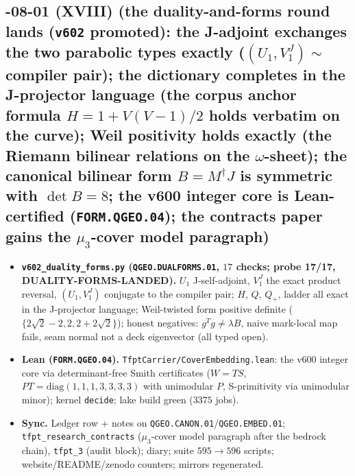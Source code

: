 \subsection*{-08-01 (XVIII) (the duality-and-forms round lands (\texttt{v602} promoted): the J-adjoint exchanges the two parabolic types exactly ($(U_1,V_1^J)\sim$ compiler pair); the dictionary completes in the J-projector language (the corpus anchor formula $H=1+V(V-1)/2$ holds verbatim on the curve); Weil positivity holds exactly (the Riemann bilinear relations on the $\omega$-sheet); the canonical bilinear form $B=M^\dagger J$ is symmetric with $\det B=8$; the v600 integer core is Lean-certified (\texttt{FORM.QGEO.04}); the contracts paper gains the $\mu_3$-cover model paragraph)}
\begin{itemize}[leftmargin=1.5em]
\item \textbf{\texttt{v602\_duality\_forms.py} (\texttt{QGEO.DUALFORMS.01}, $17$ checks; probe
17/17, DUALITY-FORMS-LANDED).} $U_1$ J-self-adjoint, $V_1^J$ the exact product reversal,
$(U_1,V_1^J)$ conjugate to the compiler pair; $H$, $Q$, $Q_+$, ladder all exact in the
J-projector language; Weil-twisted form positive definite ($\{2\sqrt2-2,2,2+2\sqrt2\}$);
honest negatives: $g^Tg\ne\lambda B$, naive mark-local map fails, seam normal not a deck
eigenvector (all typed open).
\item \textbf{Lean (\texttt{FORM.QGEO.04}).} \texttt{TfptCarrier/CoverEmbedding.lean}: the
v600 integer core via determinant-free Smith certificates ($W=TS$,
$PT=\mathrm{diag}(1,1,1,3,3,3,3)$ with unimodular $P$, S-primitivity via unimodular minor);
kernel \texttt{decide}; lake build green ($3375$ jobs).
\item \textbf{Sync.} Ledger row + notes on \texttt{QGEO.CANON.01}/\texttt{QGEO.EMBED.01};
\texttt{tfpt\_research\_contracts} ($\mu_3$-cover model paragraph after the bedrock chain),
\texttt{tfpt\_3} (audit block); diary; suite $595\to596$ scripts; website/README/zenodo
counters; mirrors regenerated.
\end{itemize}

